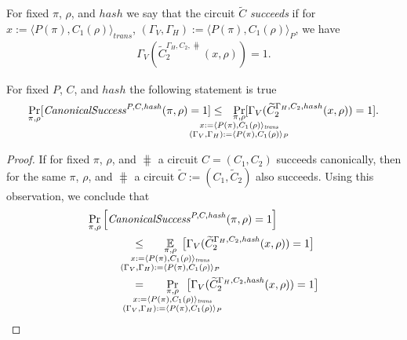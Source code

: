 For fixed $\pi$, $\rho$, and $hash$ we say that the circuit $\widetilde{C}$ \textit{succeeds} if
for $x := \langle P(\pi), C_1(\rho) \rangle_{\mathit{trans}}$,
$(\Gamma_V, \Gamma_H) := \langle P(\pi), C_1(\rho) \rangle_{P}$, we have
\begin{align*}
\Gamma_V(\widetilde{C}_2^{\Gamma_H, C_2, \hash}(x, \rho)) = 1.
\end{align*}
%
\begin{lemma}
  \label{lemma:ctilda_c}
  For fixed $P$, $C$, and $hash$ the following statement is true
  \begin{align*}
    \underset{\pi, \rho}{\Pr}[\CanonicalSuccess^{P, C, \hash}(\pi, \rho) = 1]
    \leq
    \mkern13mu
    \underset{
      \mathclap{
      \substack{
        \pi, \rho \\
        x := \langle P(\pi), C_1(\rho) \rangle_{\mathit{trans}} \\
        (\Gamma_V, \Gamma_H) := \langle P(\pi), C_1(\rho) \rangle_{P}}}}
  {\Pr}[\Gamma_V(\widetilde{C}_2^{\Gamma_H, C_2, hash}(x, \rho)) = 1].
  \end{align*}
\end{lemma}
%
\begin{proof}
If for fixed $\pi$, $\rho$, and $\hash$ a circuit $C = (C_1, C_2)$ succeeds canonically,
then for the same $\pi$, $\rho$, and $\hash$ a circuit $\widetilde{C} := (C_1, \widetilde{C}_2)$ also succeeds.
Using this observation, we conclude that
\begin{align*}
  &\underset{\pi, \rho}{\Pr}\left[\CanonicalSuccess^{P, C, \hash}(\pi, \rho) = 1\right] \\
  &\IndII \leq
  \mkern33mu
    \underset{
      \mathclap{
        \substack{\pi, \rho \\
        x := \langle P(\pi), C_1(\rho) \rangle_{\mathit{trans}} \\
        (\Gamma_V, \Gamma_H) := \langle P(\pi), C_1(\rho) \rangle_{P}
      }}}
    {\mathbb{E}}\mkern13mu\big[\Gamma_V(\widetilde{C}_2^{\Gamma_H, C_2, \hash}(x, \rho)) = 1\big] \\
  &\IndII =
  \mkern33mu
    \underset{
      \mathclap{
        \substack{\pi, \rho \\
        x := \langle P(\pi), C_1(\rho) \rangle_{\mathit{trans}} \\
        (\Gamma_V, \Gamma_H) := \langle P(\pi), C_1(\rho) \rangle_{P}
      }}}
    {\Pr}\mkern13mu\big[\Gamma_V(\widetilde{C}_2^{\Gamma_H, C_2, \hash}(x, \rho)) = 1\big]
\end{align*}
\end{proof}
